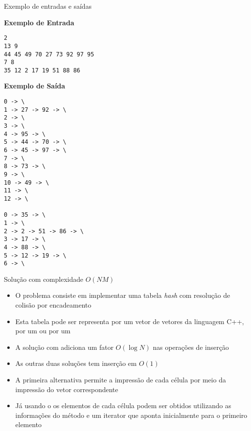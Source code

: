 \begin{frame}[fragile]{Exemplo de entradas e saídas}

\begin{scriptsize}
\begin{minipage}[t]{0.5\textwidth}
\textbf{Exemplo de Entrada}
\begin{verbatim}
2
13 9
44 45 49 70 27 73 92 97 95
7 8
35 12 2 17 19 51 88 86
\end{verbatim}
\end{minipage}
\begin{minipage}[t]{0.45\textwidth}
\textbf{Exemplo de Saída}
\begin{verbatim}
0 -> \
1 -> 27 -> 92 -> \
2 -> \
3 -> \
4 -> 95 -> \
5 -> 44 -> 70 -> \
6 -> 45 -> 97 -> \
7 -> \
8 -> 73 -> \
9 -> \
10 -> 49 -> \
11 -> \
12 -> \

0 -> 35 -> \
1 -> \
2 -> 2 -> 51 -> 86 -> \
3 -> 17 -> \
4 -> 88 -> \
5 -> 12 -> 19 -> \
6 -> \
\end{verbatim}
\end{minipage}
\end{scriptsize}

\end{frame}

\begin{frame}[fragile]{Solução com complexidade $O(NM)$}

    \begin{itemize}
        \item O problema consiste em implementar uma tabela \textit{hash} com resolução de
            colisão por encadeamento

        \item Esta tabela pode ser representa por um vetor de vetores da linguagem C++,
            por um  ou por um 

        \item A solução com  adiciona um fator $O(\log N)$ nas operações
            de inserção

        \item As outras duas soluções tem inserção em $O(1)$

        \item A primeira alternativa permite a impressão de cada célula por meio da impressão
            do vetor correspondente

        \item Já usando o  os elementos de cada célula podem
            ser obtidos utilizando as informações do método  e um
            iterator que aponta inicialmente para o primeiro elemento

   \end{itemize}

\end{frame}

